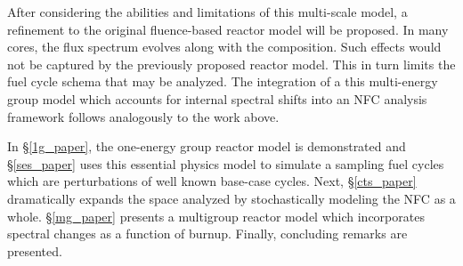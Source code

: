 After considering the abilities and limitations of this multi-scale model, a refinement to 
the original fluence-based reactor model will be proposed.  In many cores, the flux spectrum
evolves along with the composition.  Such effects would not be captured by the previously 
proposed reactor model.  This in turn limits the fuel cycle schema that may be analyzed.
The integration of a this multi-energy group model which 
accounts for internal spectral shifts into an NFC analysis framework follows
analogously to the work above.

In \S \ref{1g_paper}, the one-energy group reactor model is demonstrated and \S \ref{ses_paper}
uses this essential physics model to simulate a sampling fuel cycles which are perturbations of 
well known base-case cycles.  Next, \S \ref{cts_paper} dramatically
expands the space analyzed by stochastically 
modeling the NFC as a whole. \S \ref{mg_paper} presents a multigroup reactor
model which incorporates spectral changes as a function of burnup.  Finally, concluding remarks
are presented.

